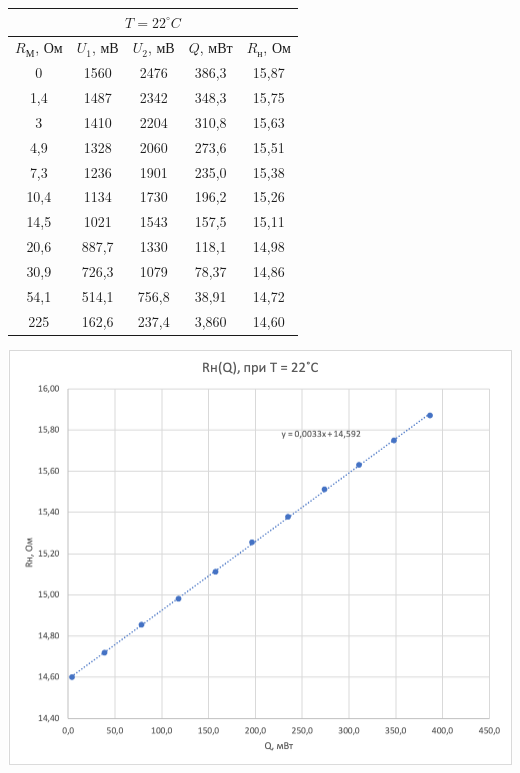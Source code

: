 \documentclass[a4paper, 12pt]{article}
\begin{document}
    \begin{table}[pt]
    
        \begin{minipage}[ht]{0.47\linewidth}
            \begin{tabular}{|c|c|c|c|c|}
                \hline
                \multicolumn{5}{|c|}{$T = 22^\circ C$} \\
                \hline
                $R_М$, Ом & $U_1$, мВ & $U_2$, мВ & $Q$, мВт & $R_н$, Ом \\
                \hline
                0 & 1560 & 2476 & 386,3 & 15,87 \\
                \hline
                1,4 & 1487 & 2342 & 348,3 & 15,75 \\
                \hline
                3 & 1410 & 2204 & 310,8 & 15,63 \\
                \hline
                4,9 & 1328 & 2060 & 273,6 & 15,51 \\
                \hline
                7,3 & 1236 & 1901 & 235,0 & 15,38 \\
                \hline
                10,4 & 1134 & 1730 & 196,2 & 15,26 \\
                \hline
                14,5 & 1021 & 1543 & 157,5 & 15,11 \\
                \hline
                20,6 & 887,7 & 1330 & 118,1 & 14,98 \\
                \hline
                30,9 & 726,3 & 1079 & 78,37 & 14,86 \\
                \hline
                54,1 & 514,1 & 756,8 & 38,91 & 14,72 \\
                \hline
                225 & 162,6 & 237,4 & 3,860 & 14,60 \\
                \hline
            \end{tabular}
        \end{minipage}
        \hfill
        \begin{minipage}[ht]{0.47\linewidth}
            \includegraphics[width=\linewidth]{images/ch1.png}
        \end{minipage}
        

\end{table}
\end{document}
